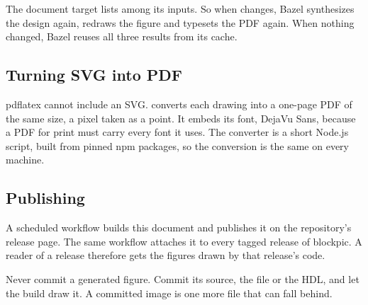 The document target lists  among its inputs. So when
 changes, Bazel synthesizes the design again, redraws the
figure and typesets the PDF again. When nothing changed, Bazel reuses all
three results from its cache.

\subsection{Turning SVG into PDF}

pdflatex cannot include an SVG.  converts each drawing into a
one-page PDF of the same size, a pixel taken as a point. It embeds its font,
DejaVu Sans, because a PDF for print must carry every font it uses.
The converter is a short Node.js script, built from pinned npm packages, so
the conversion is the same on every machine.

\subsection{Publishing}

A scheduled workflow builds this document and publishes it on the
repository's release page. The same workflow attaches it to every tagged
release of blockpic. A reader of a release therefore gets the figures drawn
by that release's code.

\begin{guideline}
Never commit a generated figure. Commit its source, the 
file or the HDL, and let the build draw it. A committed image is one more
file that can fall behind.
\end{guideline}
